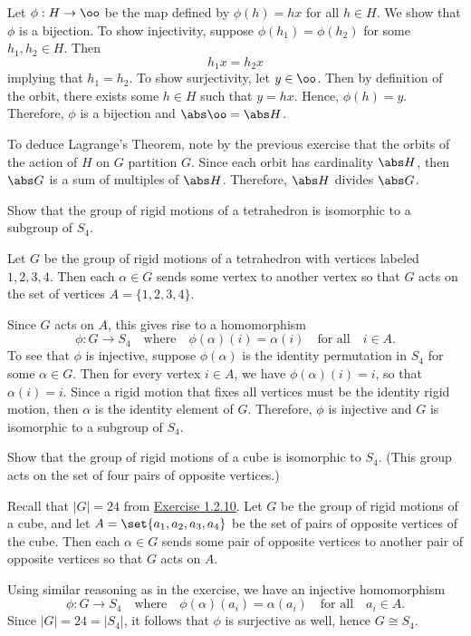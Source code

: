 \begin{sol}
    Let $\phi : H \to \oo$ be the map defined by $\phi(h) = hx$ for all $h \in H$. We show that $\phi$ is a bijection. To show injectivity, suppose $\phi(h_1) = \phi(h_2)$ for some $h_1, h_2 \in H$. Then
    \[h_1 x = h_2 x\]
    implying that $h_1 = h_2$. To show surjectivity, let $y \in \oo$. Then by definition of the orbit, there exists some $h \in H$ such that $y = hx$. Hence, $\phi(h) = y$. Therefore, $\phi$ is a bijection and $\abs \oo = \abs H$.

    To deduce Lagrange's Theorem, note by the previous exercise that the orbits of the action of $H$ on $G$ partition $G$. Since each orbit has cardinality $\abs H$, then $\abs G$ is a sum of multiples of $\abs H$. Therefore, $\abs H$ divides $\abs G$.
\end{sol}

\begin{exercise} \label{ex1.7.20}
    Show that the group of rigid motions of a tetrahedron is isomorphic to a subgroup of $S_4$.
\end{exercise}

\begin{sol}
    Let $G$ be the group of rigid motions of a tetrahedron with vertices labeled $1, 2, 3, 4$. Then each $\alpha \in G$ sends some vertex to another vertex so that $G$ acts on the set of vertices $A = \{1, 2, 3, 4\}$.

    Since $G$ acts on $A$, this gives rise to a homomorphism 
    \[\phi : G \to S_4 \quad \text{where} \quad \phi(\alpha)(i) = \alpha(i) \quad \text{for all} \quad i \in A.\]
    To see that $\phi$ is injective, suppose $\phi(\alpha)$ is the identity permutation in $S_4$ for some $\alpha \in G$. Then for every vertex $i \in A$, we have $\phi(\alpha)(i) = i$, so that $\alpha(i) = i$. Since a rigid motion that fixes all vertices must be the identity rigid motion, then $\alpha$ is the identity element of $G$. Therefore, $\phi$ is injective and $G$ is isomorphic to a subgroup of $S_4$.
\end{sol}

\begin{exercise}\label{ex1.7.21}
    Show that the group of rigid motions of a cube is isomorphic to $S_4$. (This group acts on the set of four pairs of opposite vertices.)
\end{exercise}

\begin{sol}
    Recall that $|G| = 24$ from \hyperref[ex1.2.10]{Exercise 1.2.10}. Let $G$ be the group of rigid motions of a cube, and let $A = \set{a_1, a_2, a_3, a_4}$ be the set of pairs of opposite vertices of the cube. Then each $\alpha \in G$ sends some pair of opposite vertices to another pair of opposite vertices so that $G$ acts on $A$.

    Using similar reasoning as in the exercise, we have an injective homomorphism
    \[\phi : G \to S_4 \quad \text{where} \quad \phi(\alpha)(a_i) = \alpha(a_i) \quad \text{for all} \quad a_i \in A.\]
    Since $|G| = 24 = |S_4|$, it follows that $\phi$ is surjective as well, hence $G \cong S_4$.
\end{sol}

